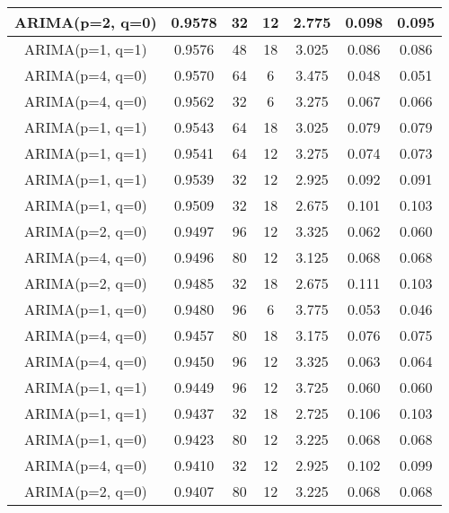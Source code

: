 \begin{table*}[h!]
\begin{tabular}{|c|c|c|c|c|c|c|}
        \hline
        ARIMA(p=2, q=0) & 0.9578 & 32 & 12 & 2.775 &  0.098 & 0.095 \\
        \hline
        ARIMA(p=1, q=1) & 0.9576 & 48 & 18 & 3.025 &  0.086 & 0.086 \\
        \hline
        ARIMA(p=4, q=0) & 0.9570 & 64 & 6 & 3.475 &  0.048 & 0.051 \\
        \hline
        ARIMA(p=4, q=0) & 0.9562 & 32 & 6 & 3.275 &  0.067 & 0.066 \\
        \hline
        ARIMA(p=1, q=1) & 0.9543 & 64 & 18 & 3.025 &  0.079 & 0.079 \\
        \hline
        ARIMA(p=1, q=1) & 0.9541 & 64 & 12 & 3.275 &  0.074 & 0.073 \\
        \hline
        ARIMA(p=1, q=1) & 0.9539 & 32 & 12 & 2.925 &  0.092 & 0.091 \\
        \hline
        ARIMA(p=1, q=0) & 0.9509 & 32 & 18 & 2.675 &  0.101 & 0.103 \\
        \hline
        ARIMA(p=2, q=0) & 0.9497 & 96 & 12 & 3.325 &  0.062 & 0.060 \\
        \hline
        ARIMA(p=4, q=0) & 0.9496 & 80 & 12 & 3.125 &  0.068 & 0.068 \\
        \hline
        ARIMA(p=2, q=0) & 0.9485 & 32 & 18 & 2.675 &  0.111 & 0.103 \\
        \hline
        ARIMA(p=1, q=0) & 0.9480 & 96 & 6 & 3.775 &  0.053 & 0.046 \\
        \hline
        ARIMA(p=4, q=0) & 0.9457 & 80 & 18 & 3.175 &  0.076 & 0.075 \\
        \hline
        ARIMA(p=4, q=0) & 0.9450 & 96 & 12 & 3.325 &  0.063 & 0.064 \\
        \hline
        ARIMA(p=1, q=1) & 0.9449 & 96 & 12 & 3.725 &  0.060 & 0.060 \\
        \hline
        ARIMA(p=1, q=1) & 0.9437 & 32 & 18 & 2.725 &  0.106 & 0.103 \\
        \hline
        ARIMA(p=1, q=0) & 0.9423 & 80 & 12 & 3.225 &  0.068 & 0.068 \\
        \hline
        ARIMA(p=4, q=0) & 0.9410 & 32 & 12 & 2.925 &  0.102 & 0.099 \\
        \hline
        ARIMA(p=2, q=0) & 0.9407 & 80 & 12 & 3.225 &  0.068 & 0.068 \\
        \hline
    \end{tabular}
\end{table*}
